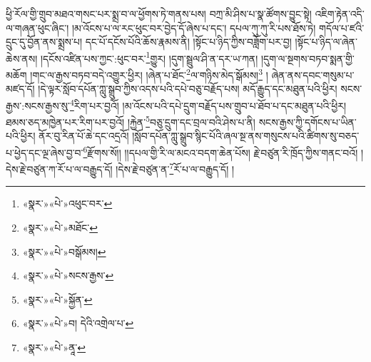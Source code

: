 ཕྱི་རོལ་གྱི་གྲུབ་མཐའ་གསང་པར་སྨྲ་བ་ལ་ཕྱོགས་ཏེ་གནས་པས། བཀྲ་མི་ཤིས་པ་སྣ་ཚོགས་བྱུང་སྟེ། འཇིག་རྟེན་འདི་ལ་གཞན་ཕུང་ཞིང་། །མ་འོངས་པ་ལ་རང་ཕུང་བར་བྱེད་དོ་ཞེས་པ་དང་། དཔལ་ཀུ་ཀུ་རི་པས་ཐོས་ཏེ། གདོལ་པ་ཛའི་དྲུང་དུ་བྱོན་ནས་སྨྲས་པ། དང་པོ་དངོས་པོའི་ཆོས་རྣམས་ནི། །སྟོང་པ་ཉིད་ཀྱིས་བཟློག་པར་བྱ། །སྟོང་པ་ཉིད་ལ་ཞེན་ཆེས་ནས། །དངོས་འཛིན་པས་ཀྱང་:ཕུང་བར་\footnote{«སྣར་»«པེ་»འཕུང་བར་}གྱུར། །དུག་སྦྲུལ་ཤི་ན་དར་ཡ་ཀན། །དུག་ལ་སྔགས་བཏབ་སྨན་གྱི་མཆོག །གང་ལ་རྒྱས་བཏབ་བདེ་འགྱུར་ཕྱིར། །ཞེན་པ་ཐོང་\footnote{«སྣར་»«པེ་»མཐོང་}ལ་གཉིས་མེད་སྒོམས།\footnote{«སྣར་»«པེ་»བསྒོམས།} །
ཞེན་ནས་དབང་གསུམ་པ་མཛད་དོ། །དེ་ལྟར་སློབ་དཔོན་ཀླུ་སྒྲུབ་ཀྱིས་འདས་པའི་དཔེ་བཅུ་བརྗོད་པས། མདོ་རྒྱུད་དང་མཐུན་པའི་ཕྱིར། སངས་རྒྱས་:སངས་རྒྱས་སུ་\footnote{«སྣར་»«པེ་»སངས་རྒྱས་}རིག་པར་བྱའོ། །མ་འོངས་པའི་དཔེ་དྲུག་བརྗོད་པས་གྲུབ་པ་ཐོབ་པ་དང་མཐུན་པའི་ཕྱིར། ཐམས་ཅད་མཁྱེན་པར་རིག་པར་བྱའོ། །རྐྱེན་\footnote{«སྣར་»«པེ་»སྐྱོན་}བཅུ་དྲུག་དང་བྲལ་བའི་ཤེས་པ་ནི། སངས་རྒྱས་ཀྱི་དགོངས་པ་ཡིན་པའི་ཕྱིར། ནོར་བུ་རིན་པོ་ཆེ་དང་འདྲའོ། །སློབ་དཔོན་ཀླུ་སྒྲུབ་སྙིང་པོའི་ཞལ་སྔ་ནས་གསུངས་པའི་ཚིགས་སུ་བཅད་པ་ཕྱེད་དང་ལྔ་ཞེས་བྱ་བ་\footnote{«སྣར་»«པེ་»བ། དེའི་འགྲེལ་པ་}རྫོགས་སོ།། །།དཔལ་གྱི་རི་ལ་མངའ་བདག་ཆེན་པོས། རྗེ་བཙུན་རི་ཁྲོད་ཀྱིས་གནང་བའོ། །དེས་རྗེ་བཙུན་ཀ་རོ་པ་ལ་བརྒྱུད་དོ། །དེས་རྗེ་བཙུན་ན་\footnote{«སྣར་»«པེ་»ནཱ་}རོ་པ་ལ་བརྒྱུད་དོ། ། 